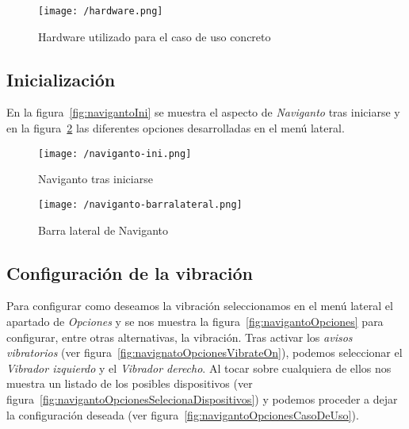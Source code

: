 \begin{figure}[!h]
  \begin{center}
    \texttt{[image: /hardware.png]}
    \caption{Hardware utilizado para el caso de uso concreto}
    \label{fig:hardware}
  \end{center}
\end{figure}

\subsection{Inicialización}

En la figura~\ref{fig:navigantoIni} se muestra el aspecto de \emph{Naviganto} tras iniciarse y en la
figura~\ref{fig:navigantoBarra} las diferentes opciones desarrolladas en el menú lateral.

\begin{figure}[!h]
  \begin{minipage}[b]{0.5\linewidth}
    \begin{center}
      \texttt{[image: /naviganto-ini.png]}
      \caption{Naviganto tras iniciarse}
      \label{fig:navigantoIni}
    \end{center}
  \end{minipage}
  \begin{minipage}[b]{0.5\linewidth}
    \begin{center}
      \texttt{[image: /naviganto-barralateral.png]}
      \caption{Barra lateral de Naviganto}
      \label{fig:navigantoBarra}
    \end{center}
  \end{minipage}
\end{figure}

\subsection{Configuración de la vibración}

Para configurar como deseamos la vibración seleccionamos en el menú lateral el apartado de
\emph{Opciones} y se nos muestra la figura~\ref{fig:navigantoOpciones} para configurar, entre otras
alternativas, la vibración. Tras activar los \emph{avisos vibratorios} (ver
figura~\ref{fig:navignatoOpcionesVibrateOn}), podemos seleccionar el \emph{Vibrador izquierdo} y el
\emph{Vibrador derecho}. Al tocar sobre cualquiera de ellos nos muestra un listado de los posibles
dispositivos (ver figura~\ref{fig:navigantoOpcionesSelecionaDispositivos}) y podemos proceder a
dejar la configuración deseada (ver figura~\ref{fig:navigantoOpcionesCasoDeUso}).

